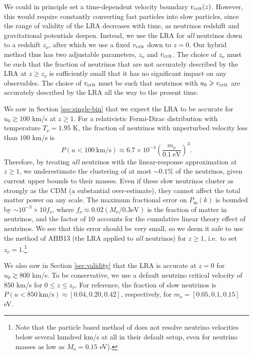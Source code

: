 \documentclass[useAMS, usenatbib]{mnras}
\newcommand{\beq}{\begin{equation}}
\newcommand{\eeq}{\end{equation}}
\begin{document}
We could in principle set a time-dependent velocity boundary $v_{\rm crit}(z)$. However, this would require constantly converting fast particles into slow particles, since the range of validity of the LRA decreases with time, as neutrinos redshift and gravitational potentials deepen. Instead, we use the LRA for \emph{all} neutrinos down to a redshift $z_\nu$, after which we use a fixed $v_{\rm crit}$ down to $z = 0$. Our hybrid method thus has two adjustable parameters, $z_\nu$ and $v_{\rm crit}$. The choice of $z_\nu$ must be such that the fraction of neutrinos that are not accurately described by the LRA at $z \geq z_\nu$ is sufficiently small that it has no significant impact on any observables. The choice of $v_{\rm crit}$ must be such that neutrinos with $u_0 \geq v_{\rm crit}$ are accurately described by the LRA all the way to the present time.

We saw in Section \ref{sec:single-bin} that we expect the LRA to be accurate for $u_0 \gtrsim 100$ km/s at $z \geq 1$. For a relativistic Fermi-Dirac distribution with temperature $T_\nu = 1.95$ K, the fraction of neutrinos with unperturbed velocity less than $100$ km/s is
\beq
P(u < 100 ~\textrm{km/s}) \approx 6.7 \times 10^{-4} \left(\frac{m_{\nu}}{0.1~\textrm{eV}}\right)^3.
\eeq
Therefore, by treating \emph{all} neutrinos with the linear-response approximation at $z \geq 1$, we underestimate the clustering of at most $\sim 0.1\%$ of the neutrinos, given current upper bounds to their masses.
Even if these slow neutrinos cluster as strongly as the CDM (a substantial over-estimate), they cannot affect the total matter power on any scale. The maximum fractional error on $P_\mathrm{m}(k)$ is bounded by $\sim 10^{-3} \times 10 f_{\nu}$, where $f_\nu \approx 0.02 (M_\nu/0.3 \textrm{eV})$ is the fraction of matter in neutrinos, and the factor of $10$ accounts for the cumulative linear theory effect of neutrinos.
We see that this error should be very small, so we deem it safe to use the method of AHB13 (the LRA applied to \emph{all} neutrinos) for $z \geq 1$, i.e.~to set $z_\nu = 1$.\footnote{Note that the particle based method of \cite{Banerjee_2018} does not resolve neutrino velocities below several hundred km/s at all in their default setup, even for neutrino masses as low as $M_\nu = 0.15$ eV).}

We also saw in Section \ref{sec:validity} that the LRA is accurate at $z = 0$ for $u_0 \gtrsim 800$ km/s. To be conservative, we use a default neutrino critical velocity of $850$ km/s for $0 \leq z \leq z_\nu$. For reference, the fraction of slow neutrinos is $P(u < 850 ~\textrm{km/s}) \approx [0.04, 0.20, 0.42]$, respectively, for  $m_{\nu} = [0.05, 0.1, 0.15]$ eV.
\end{document}
